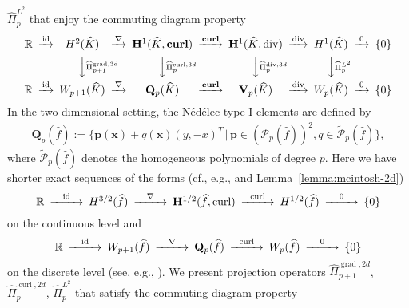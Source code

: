 \documentclass{article}
\newcommand{\hatPicurlcom}{\widehat \Pi^{\operatorname*{curl},3d}_p}
\newcommand{\hatPicurlcomtwod}{\widehat \Pi^{\operatorname*{curl},2d}_p}
\newcommand{\hatPigradcom}{\widehat\Pi^{\operatorname*{grad},3d}_{p+1}}
\newcommand{\hatPigradcomtwod}{\widehat\Pi^{\operatorname*{grad},2d}_{p+1}}
\newcommand{\hatPidivcom}{\widehat\Pi^{\operatorname*{div},3d}_{p}}
\begin{document}
$\widehat{\Pi}_{p}^{L^{2}}$ that enjoy the commuting diagram property
\begin{equation}
\minCDarrowwidth14pt
\begin{CD} \mathbb{R} @> \operatorname*{id} >> H^2(\widehat K) @> \nabla >> \mathbf{H}^1(\widehat K, \operatorname*{\mathbf{curl}}) @> \operatorname*{\mathbf{curl}} >> \mathbf{H}^1(\widehat K, \operatorname*{div}) @> \operatorname*{div} >> H^1(\widehat K) @> \operatorname*{0} >> \{0\}\\ @. @VV \hatPigradcom V @VV \hatPicurlcom V @VV \hatPidivcom V @VV \widehat \Pi^{L^2}_p V \\ \mathbb{R} @> \operatorname*{id} >> W_{p+1}(\widehat K) @> \nabla >> {\mathbf Q}_p(\widehat K) @> \operatorname*{\mathbf{curl}} >> {\mathbf V}_p(\widehat K) @> \operatorname*{div} >> W_p(\widehat K) @> \operatorname*{0} >>\{0\}\end{CD} \label{eq:commuting-diagram-hinten}
\end{equation}
In the two-dimensional setting, the N\'{e}d\'{e}lec type I elements are defined by
\begin{align}
\label{eq:2d-nedelec}
\mathbf{Q}_p(\widehat{f}) := \{\mathbf{p}(\mathbf{x}) + q({\mathbf x}) (y,-x)^T \, | \, \mathbf{p} \in (\mathcal{P}_p(\widehat{f}))^2, q\in \widetilde{\mathcal{P}}_p(\widehat{f})\},
\end{align}
where $\widetilde{\mathcal{P}}_p(\widehat{f})$ denotes the homogeneous polynomials of degree $p$. Here we have shorter exact sequences of the forms
(cf., e.g., \cite{costabel-mcintosh10} and Lemma~\ref{lemma:mcintosh-2d})
\begin{align}
\begin{CD} \mathbb{R} @> \operatorname*{id} >> H^{3/2}(\widehat f) @> \nabla >> \mathbf{H}^{1/2}(\widehat f, \operatorname*{curl}) @> \operatorname*{curl} >> H^{1/2}(\widehat f) @> \operatorname*{0} >> \{0\} \end{CD}
\end{align}
on the continuous level and
\begin{align}
\begin{CD} \mathbb{R} @> \operatorname*{id} >> W_{p+1}(\widehat f) @> \nabla >> \mathbf{Q}_p(\widehat{f}) @> \operatorname*{{curl}} >> W_p(\widehat f) @> \operatorname*{0} >> \{0\} \end{CD}
\end{align}
on the discrete level (see, e.g., \cite[(30)]{demkowicz08}). We present projection operators $\hatPigradcomtwod$, $\hatPicurlcomtwod$, $\widehat{\Pi}_p^{L^2}$ that satisfy the commuting diagram property
\end{document}
